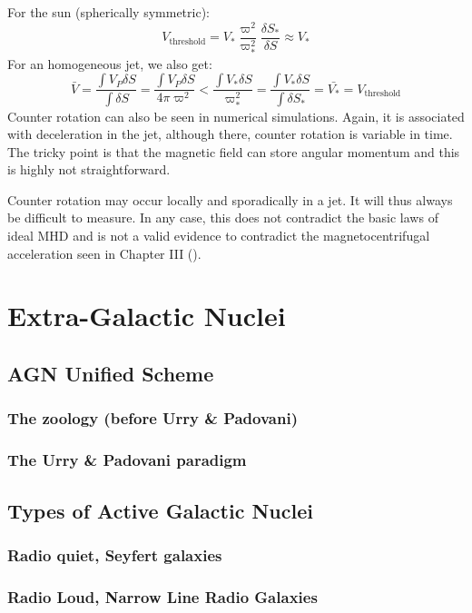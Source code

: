\documentclass[10pt,a4paper,english]{article}
\begin{document}
For the sun (spherically symmetric):
\begin{equation}
  V_\mathrm{threshold} = V_* \frac{\varpi^2}{\varpi_*^2}\frac{\delta S_*}{\delta S} \approx V_*
\end{equation}
For an homogeneous jet, we also get:
\begin{equation}
  \bar{V} = \frac{\int V_P \delta S}{\int \delta S} = \frac{\int V_P \delta S}{4\pi\varpi^2} < \frac{\int V_* \delta S}{\varpi^2_*} = \frac{\int V_* \delta S}{\int \delta S_*} = \bar{V_*} = V_\mathrm{threshold}
\end{equation}
Counter rotation can also be seen in numerical simulations. Again, it is associated with deceleration in the jet, although there, counter rotation is variable in time. The tricky point is that the magnetic field can store angular momentum and this is highly not straightforward.

Counter rotation may occur locally and sporadically in a jet. It will thus always be difficult to measure. In any case, this does not contradict the basic laws of ideal MHD and is not a valid evidence to contradict the magnetocentrifugal acceleration seen in Chapter III ().
\section{Extra-Galactic Nuclei}
\subsection{AGN Unified Scheme}
\subsubsection{The zoology (before Urry \& Padovani)}
\subsubsection{The Urry \& Padovani paradigm}
\subsection{Types of Active Galactic Nuclei}
\subsubsection{Radio quiet, Seyfert galaxies}
\subsubsection{Radio Loud, Narrow Line Radio Galaxies}
\end{document}
